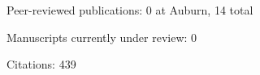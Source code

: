 \begin{tightItemize}
    \item Peer-reviewed publications: 0 at Auburn, 14 total
    \item Manuscripts currently under review: 0
    \item Citations: 439
\end{tightItemize}
